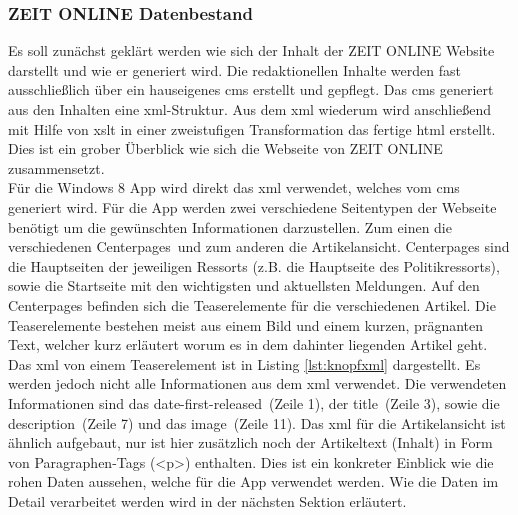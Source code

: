 \documentclass[12pt,a4paper]{scrartcl}
\begin{document}
\subsubsection{ZEIT ONLINE Datenbestand}
\label{subsubsec:zondatenbestand}
Es soll zunächst geklärt werden wie sich der Inhalt der ZEIT ONLINE Website darstellt und wie er generiert wird. Die redaktionellen Inhalte werden fast ausschließlich über ein hauseigenes \ac{cms} erstellt und gepflegt. Das \ac{cms} generiert aus den Inhalten eine \ac{xml}-Struktur. Aus dem \ac{xml} wiederum wird anschließend mit Hilfe von \ac{xslt} in einer zweistufigen Transformation das fertige \ac{html} erstellt. Dies ist ein grober Überblick wie sich die Webseite von ZEIT ONLINE zusammensetzt.\\
Für die Windows 8 App wird direkt das \ac{xml} verwendet, welches vom \ac{cms} generiert wird. Für die App werden zwei verschiedene Seitentypen der Webseite benötigt um die gewünschten Informationen darzustellen. Zum einen die verschiedenen \glqq Centerpages\grqq\ und zum anderen die Artikelansicht. Centerpages sind die Hauptseiten der jeweiligen Ressorts (z.B. die Hauptseite des Politikressorts), sowie die Startseite mit den wichtigsten und aktuellsten Meldungen. Auf den Centerpages befinden sich die Teaserelemente für die verschiedenen Artikel. Die Teaserelemente bestehen meist aus einem Bild und einem kurzen, prägnanten Text, welcher kurz erläutert worum es in dem dahinter liegenden Artikel geht.\\

Das \ac{xml} von einem Teaserelement ist in Listing \ref{lst:knopfxml} dargestellt. Es werden jedoch nicht alle Informationen aus dem \ac{xml} verwendet. Die verwendeten Informationen sind das \glqq date-first-released\grqq\ (Zeile 1), der \glqq title\grqq\ (Zeile 3), sowie die \glqq description\grqq\ (Zeile 7) und das \glqq image\grqq\ (Zeile 11). Das \ac{xml} für die Artikelansicht ist ähnlich aufgebaut, nur ist hier zusätzlich noch der Artikeltext (Inhalt) in Form von Paragraphen-Tags (<p>) enthalten. Dies ist ein konkreter Einblick wie die rohen Daten aussehen, welche für die App verwendet werden. Wie die Daten im Detail verarbeitet werden wird in der nächsten Sektion erläutert.
\end{document}
